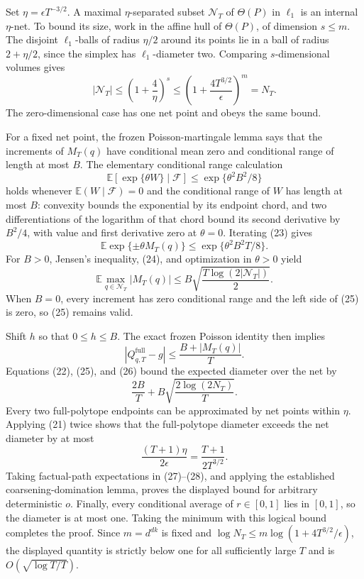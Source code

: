 Set \(\eta=\epsilon T^{-3/2}\).  A maximal \(\eta\)-separated subset \(\mathcal N_T\) of \(\Theta(P)\) in \(\ell_1\) is an internal \(\eta\)-net.  To bound its size, work in the affine hull of \(\Theta(P)\), of dimension \(s\leq m\).  The disjoint \(\ell_1\)-balls of radius \(\eta/2\) around its points lie in a ball of radius \(2+\eta/2\), since the simplex has \(\ell_1\)-diameter two.  Comparing \(s\)-dimensional volumes gives
\[
 |\mathcal N_T|\leq\left(1+\frac4\eta\right)^s
 \leq\left(1+\frac{4T^{3/2}}\epsilon\right)^m=N_T.
 \tag{22}
\]
The zero-dimensional case has one net point and obeys the same bound.

For a fixed net point, the frozen Poisson-martingale lemma says that the increments of \(M_T(q)\) have conditional mean zero and conditional range of length at most \(B\).  The elementary conditional range calculation
\[
 \mathbb E[\exp\{\theta W\}\mid\mathcal F]
 \leq\exp\{\theta^2B^2/8\}
 \tag{23}
\]
holds whenever \(\mathbb E(W\mid\mathcal F)=0\) and the conditional range of \(W\) has length at most \(B\): convexity bounds the exponential by its endpoint chord, and two differentiations of the logarithm of that chord bound its second derivative by \(B^2/4\), with value and first derivative zero at \(\theta=0\).  Iterating (23) gives
\[
 \mathbb E\exp\{\pm\theta M_T(q)\}
 \leq\exp\{\theta^2B^2T/8\}.
 \tag{24}
\]
For \(B>0\), Jensen's inequality, (24), and optimization in \(\theta>0\) yield
\[
 \mathbb E\max_{q\in\mathcal N_T}|M_T(q)|
 \leq B\sqrt{\frac{T\log(2|\mathcal N_T|)}2}.
 \tag{25}
\]
When \(B=0\), every increment has zero conditional range and the left side of (25) is zero, so (25) remains valid.

Shift \(h\) so that \(0\leq h\leq B\).  The exact frozen Poisson identity then implies
\[
 \left|Q^{\mathrm{full}}_{q,T}-g\right|
 \leq\frac{B+|M_T(q)|}{T}.
 \tag{26}
\]
Equations (22), (25), and (26) bound the expected diameter over the net by
\[
 \frac{2B}{T}+B\sqrt{\frac{2\log(2N_T)}T}.
 \tag{27}
\]
Every two full-polytope endpoints can be approximated by net points within \(\eta\).  Applying (21) twice shows that the full-polytope diameter exceeds the net diameter by at most
\[
 \frac{(T+1)\eta}{2\epsilon}=\frac{T+1}{2T^{3/2}}.
 \tag{28}
\]
Taking factual-path expectations in (27)--(28), and applying the established coarsening-domination lemma, proves the displayed bound for arbitrary deterministic \(o\).  Finally, every conditional average of \(r\in[0,1]\) lies in \([0,1]\), so the diameter is at most one.  Taking the minimum with this logical bound completes the proof.  Since \(m=d^{dk}\) is fixed and \(\log N_T\leq m\log(1+4T^{3/2}/\epsilon)\), the displayed quantity is strictly below one for all sufficiently large \(T\) and is \(O(\sqrt{\log T/T})\).
